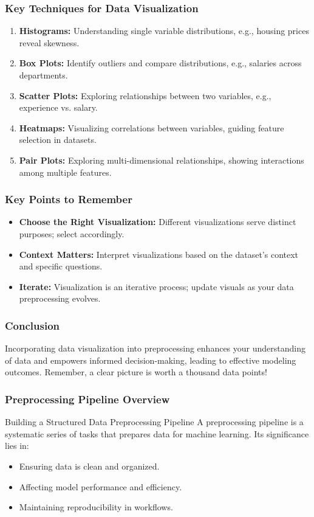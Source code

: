 \documentclass[aspectratio=169]{beamer}
\begin{document}
\begin{frame}[fragile]
    \frametitle{Key Techniques for Data Visualization}
    \begin{enumerate}
        \item \textbf{Histograms:} Understanding single variable distributions, e.g., housing prices reveal skewness.
        \item \textbf{Box Plots:} Identify outliers and compare distributions, e.g., salaries across departments.
        \item \textbf{Scatter Plots:} Exploring relationships between two variables, e.g., experience vs. salary.
        \item \textbf{Heatmaps:} Visualizing correlations between variables, guiding feature selection in datasets.
        \item \textbf{Pair Plots:} Exploring multi-dimensional relationships, showing interactions among multiple features.
    \end{enumerate}
\end{frame}

\begin{frame}[fragile]
    \frametitle{Key Points to Remember}
    \begin{itemize}
        \item \textbf{Choose the Right Visualization:} Different visualizations serve distinct purposes; select accordingly.
        \item \textbf{Context Matters:} Interpret visualizations based on the dataset's context and specific questions.
        \item \textbf{Iterate:} Visualization is an iterative process; update visuals as your data preprocessing evolves.
    \end{itemize}
\end{frame}

\begin{frame}[fragile]
    \frametitle{Conclusion}
    Incorporating data visualization into preprocessing enhances your understanding of data and empowers informed decision-making, leading to effective modeling outcomes. Remember, a clear picture is worth a thousand data points!
\end{frame}

\begin{frame}[fragile]
    \frametitle{Preprocessing Pipeline Overview}
    \begin{block}{Building a Structured Data Preprocessing Pipeline}
        A preprocessing pipeline is a systematic series of tasks that prepares data for machine learning. Its significance lies in:
        \begin{itemize}
            \item Ensuring data is clean and organized.
            \item Affecting model performance and efficiency.
            \item Maintaining reproducibility in workflows.
        \end{itemize}
    \end{block}
\end{frame}
\end{document}
